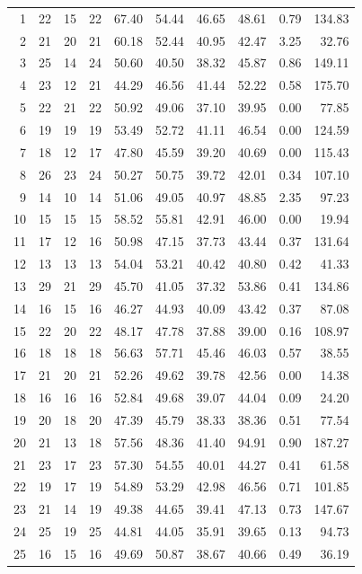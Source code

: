 \begin{longtable}{rrrrrrrrrr}
1 & 22 & 15 & 22 & 67.40 & 54.44 & 46.65 & 48.61 & 0.79 & 134.83 \\
2 & 21 & 20 & 21 & 60.18 & 52.44 & 40.95 & 42.47 & 3.25 & 32.76 \\
3 & 25 & 14 & 24 & 50.60 & 40.50 & 38.32 & 45.87 & 0.86 & 149.11 \\
4 & 23 & 12 & 21 & 44.29 & 46.56 & 41.44 & 52.22 & 0.58 & 175.70 \\
5 & 22 & 21 & 22 & 50.92 & 49.06 & 37.10 & 39.95 & 0.00 & 77.85 \\
6 & 19 & 19 & 19 & 53.49 & 52.72 & 41.11 & 46.54 & 0.00 & 124.59 \\
7 & 18 & 12 & 17 & 47.80 & 45.59 & 39.20 & 40.69 & 0.00 & 115.43 \\
8 & 26 & 23 & 24 & 50.27 & 50.75 & 39.72 & 42.01 & 0.34 & 107.10 \\
9 & 14 & 10 & 14 & 51.06 & 49.05 & 40.97 & 48.85 & 2.35 & 97.23 \\
10 & 15 & 15 & 15 & 58.52 & 55.81 & 42.91 & 46.00 & 0.00 & 19.94 \\
11 & 17 & 12 & 16 & 50.98 & 47.15 & 37.73 & 43.44 & 0.37 & 131.64 \\
12 & 13 & 13 & 13 & 54.04 & 53.21 & 40.42 & 40.80 & 0.42 & 41.33 \\
13 & 29 & 21 & 29 & 45.70 & 41.05 & 37.32 & 53.86 & 0.41 & 134.86 \\
14 & 16 & 15 & 16 & 46.27 & 44.93 & 40.09 & 43.42 & 0.37 & 87.08 \\
15 & 22 & 20 & 22 & 48.17 & 47.78 & 37.88 & 39.00 & 0.16 & 108.97 \\
16 & 18 & 18 & 18 & 56.63 & 57.71 & 45.46 & 46.03 & 0.57 & 38.55 \\
17 & 21 & 20 & 21 & 52.26 & 49.62 & 39.78 & 42.56 & 0.00 & 14.38 \\
18 & 16 & 16 & 16 & 52.84 & 49.68 & 39.07 & 44.04 & 0.09 & 24.20 \\
19 & 20 & 18 & 20 & 47.39 & 45.79 & 38.33 & 38.36 & 0.51 & 77.54 \\
20 & 21 & 13 & 18 & 57.56 & 48.36 & 41.40 & 94.91 & 0.90 & 187.27 \\
21 & 23 & 17 & 23 & 57.30 & 54.55 & 40.01 & 44.27 & 0.41 & 61.58 \\
22 & 19 & 17 & 19 & 54.89 & 53.29 & 42.98 & 46.56 & 0.71 & 101.85 \\
23 & 21 & 14 & 19 & 49.38 & 44.65 & 39.41 & 47.13 & 0.73 & 147.67 \\
24 & 25 & 19 & 25 & 44.81 & 44.05 & 35.91 & 39.65 & 0.13 & 94.73 \\
25 & 16 & 15 & 16 & 49.69 & 50.87 & 38.67 & 40.66 & 0.49 & 36.19 \\

\end{longtable}
